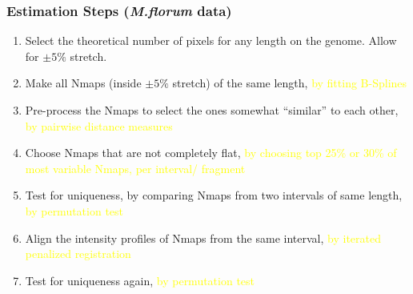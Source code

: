 \documentclass[10pt,dvipsnames,table]{beamer}
\begin{document}
\begin{frame}
\frametitle{Estimation Steps ({\emph{M.florum}} data)}
\begin{enumerate}
\item Select the theoretical number of pixels for any length on the genome. Allow for $\pm 5\%$ stretch. 
\item Make all Nmaps (inside $\pm 5\%$ stretch) of the same length, {\textcolor{yellow}{by fitting B-Splines}}
\item Pre-process the Nmaps to select the ones somewhat ``similar'' to each other, {\textcolor{yellow}{by pairwise distance measures}}
\item Choose Nmaps that are not completely flat, {\textcolor{yellow}{by choosing top 25\% or 30\% of most variable Nmaps, per interval/ fragment}}
\item Test for uniqueness, by comparing Nmaps from two intervals of same length, {\textcolor{yellow}{by permutation test}}
\item Align the intensity profiles of Nmaps from the same interval, {\textcolor{yellow}{by iterated penalized registration}}
\item Test for uniqueness again, {\textcolor{yellow}{by permutation test}}
\end{enumerate}
\end{frame}
\end{document}
